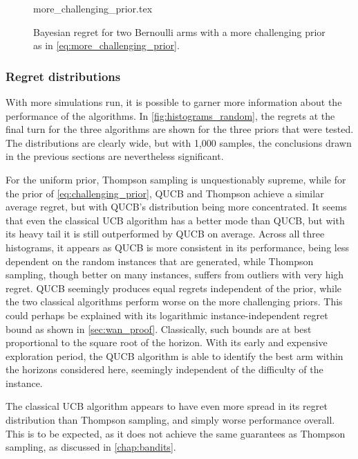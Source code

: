 \begin{figure}[p]
    \centering
    \newcommand{\myoptions}{
        width=10cm,
        height=8cm,
        xlabel={Kiloturn},
        ylabel={Regret},
        legend entries={UCB, QUCB, Thompson},
        legend pos=north west,
        legend cell align=left,
        mystyle,
    }
    {more_challenging_prior.tex}
    \caption[
        Bayesian regret for two Bernoulli arms, more challenging prior.
    ]
    {
        Bayesian regret for two Bernoulli arms with a more challenging prior as in \cref{eq:more_challenging_prior}.
    }
    \label{fig:random3}
\end{figure}

\subsubsection{Regret distributions}
With more simulations run, it is possible to garner more information about the performance of the algorithms.
In \cref{fig:histograms_random}, the regrets at the final turn for the three algorithms are shown for the three priors that were tested.
The distributions are clearly wide, but with 1,000 samples, the conclusions drawn in the previous sections are nevertheless significant.

For the uniform prior, Thompson sampling is unquestionably supreme, while for the prior of \cref{eq:challenging_prior}, QUCB and Thompson achieve a similar average regret, but with QUCB's distribution being more concentrated.
It seems that even the classical UCB algorithm has a better mode than QUCB, but with its heavy tail it is still outperformed by QUCB on average.
Across all three histograms, it appears as QUCB is more consistent in its performance, being less dependent on the random instances that are generated, while Thompson sampling, though better on many instances, suffers from outliers with very high regret.
QUCB seemingly produces equal regrets independent of the prior, while the two classical algorithms perform worse on the more challenging priors.
This could perhaps be explained with its logarithmic instance-independent regret bound as shown in \cref{sec:wan_proof}.
Classically, such bounds are at best proportional to the square root of the horizon.
With its early and expensive exploration period, the QUCB algorithm is able to identify the best arm within the horizons considered here, seemingly independent of the difficulty of the instance.

The classical UCB algorithm appears to have even more spread in its regret distribution than Thompson sampling, and simply worse performance overall.
This is to be expected, as it does not achieve the same guarantees as Thompson sampling, as discussed in \cref{chap:bandits}.


